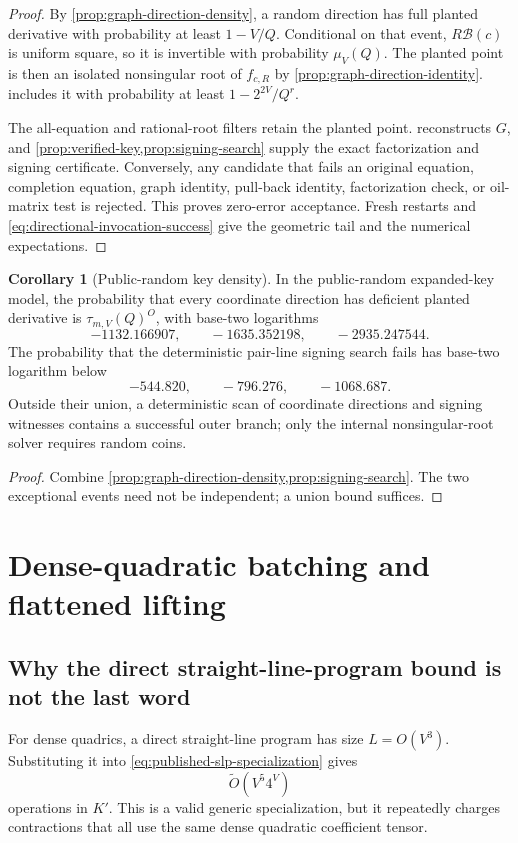 \documentclass[11pt,a4paper]{article}
\theoremstyle{definition}
\newtheorem{corollary}[theorem]{Corollary}
\theoremstyle{remark}
\newcommand{\softO}{\widetilde O}
\begin{document}
\begin{proof}
By \cref{prop:graph-direction-density}, a random direction has full planted derivative with probability at least $1-V/Q$.  Conditional on that event, $R\mathcal B(c)$ is uniform square, so it is invertible with probability $\mu_V(Q)$.  The planted point is then an isolated nonsingular root of $f_{c,R}$ by \cref{prop:graph-direction-identity}.   includes it with probability at least $1-2^{2V}/Q^r$.

The all-equation and rational-root filters retain the planted point.   reconstructs $G$, and \cref{prop:verified-key,prop:signing-search} supply the exact factorization and signing certificate.  Conversely, any candidate that fails an original equation, completion equation, graph identity, pull-back identity, factorization check, or oil-matrix test is rejected.  This proves zero-error acceptance.  Fresh restarts and \eqref{eq:directional-invocation-success} give the geometric tail and the numerical expectations.
\end{proof}

\begin{corollary}[Public-random key density]\label{cor:directional-public-random}
In the public-random expanded-key model, the probability that every coordinate direction has deficient planted derivative is
$\tau_{m,V}(Q)^O$, with base-two logarithms
\[
 -1132.166907,\qquad-1635.352198,\qquad-2935.247544.
\]
The probability that the deterministic pair-line signing search fails has base-two logarithm below
\[
 -544.820,\qquad-796.276,\qquad-1068.687.
\]
Outside their union, a deterministic scan of coordinate directions and signing witnesses contains a successful outer branch; only the internal nonsingular-root solver requires random coins.
\end{corollary}

\begin{proof}
Combine \cref{prop:graph-direction-density,prop:signing-search}.  The two exceptional events need not be independent; a union bound suffices.
\end{proof}

\section{Dense-quadratic batching and flattened lifting}\label{sec:flat-lifting}

\subsection{Why the direct straight-line-program bound is not the last word}
For dense quadrics, a direct straight-line program has size $L=O(V^3)$.  Substituting it into \eqref{eq:published-slp-specialization} gives
\begin{equation}\label{eq:slp-asymptotic}
 \softO(V^5 4^V)
\end{equation}
operations in $K'$.  This is a valid generic specialization, but it repeatedly charges contractions that all use the same dense quadratic coefficient tensor.
\end{document}

